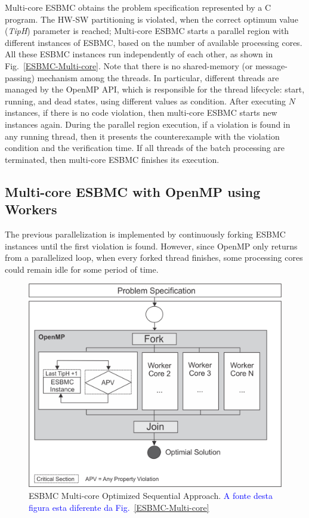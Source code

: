 Multi-core ESBMC obtains the problem specification represented by a C program. The HW-SW partitioning is violated, when the correct optimum value (\textit{TipH}) parameter is reached; Multi-core ESBMC starts a parallel region with different instances of ESBMC, based on the number of available processing cores. All these ESBMC instances run independently of each other, as shown in Fig.~\ref{ESBMC-Multi-core}. Note that there is no shared-memory (or message-passing) mechanism among the threads. In particular, different threads are managed by the OpenMP API, which is responsible for the thread lifecycle: start, running, and dead states, using different values as condition. After executing $N$ instances, if there is no code violation, then multi-core ESBMC starts new instances again. During the parallel region execution, if a violation is found in any running thread, then it presents the counterexample with the violation condition and the verification time. If all threads of the batch processing are terminated, then multi-core ESBMC finishes its execution.

\subsection{Multi-core ESBMC with OpenMP using Workers}
\label{Multi-core-ESBMC-with-OpenMP-using-workers}

The previous parallelization is implemented by continuously forking ESBMC instances until the first violation is found. However, since OpenMP only returns from a parallelized loop, when every forked thread finishes, some processing cores could remain idle for some period of time.

\begin{figure}[ht]
	\centering
  \includegraphics[scale=0.75]{Image/esbmc-parallel.png} 
	\caption{ESBMC Multi-core Optimized Sequential Approach. \textcolor{blue}{A fonte desta figura esta diferente da Fig.~\ref{ESBMC-Multi-core}}}
	\label{ESBMC-Multi-core-Optimized-Sequential-Approach}
\end{figure}

